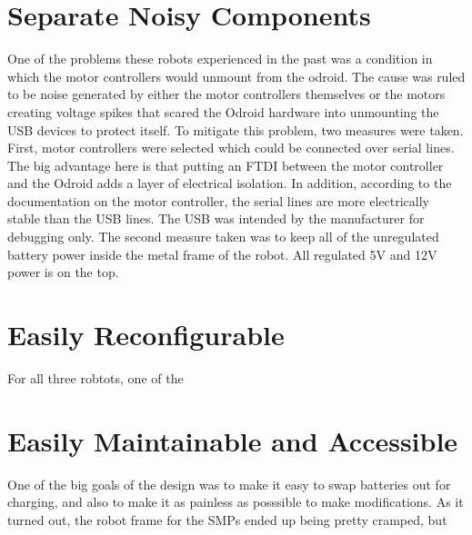 \section{Separate Noisy Components}

One of the problems these robots experienced in the past was a condition in which the motor controllers would unmount from the odroid. The cause was ruled to be noise generated by either the motor controllers themselves or the motors creating voltage spikes that scared the Odroid hardware into unmounting the USB devices to protect itself. To mitigate this problem, two measures were taken. First, motor controllers were selected which could be connected over serial lines. The big advantage here is that putting an FTDI between the motor controller and the Odroid adds a layer of electrical isolation. In addition, according to the documentation on the motor controller, the serial lines are more electrically stable than the USB lines. The USB was intended by the manufacturer for debugging only. The second measure taken was to keep all of the unregulated battery power inside the metal frame of the robot. All regulated 5V and 12V power is on the top.

\section{Easily Reconfigurable}

For all three robtots, one of the 

\section{Easily Maintainable and Accessible}

One of the big goals of the design was to make it easy to swap batteries out for charging, and also to make it as painless as posssible to make modifications. As it turned out, the robot frame for the SMPs ended up being pretty cramped, but 
